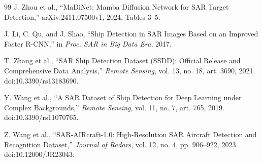 \documentclass[journal]{IEEEtran}
\begin{document}
\begin{thebibliography}{99}
J. Zhou et al., ``MaDiNet: Mamba Diffusion Network for SAR Target Detection,'' arXiv:2411.07500v1, 2024, Tables 3--5.

J. Li, C. Qu, and J. Shao, ``Ship Detection in SAR Images Based on an Improved Faster R-CNN,'' in \emph{Proc. SAR in Big Data Era}, 2017.

T. Zhang et al., ``SAR Ship Detection Dataset (SSDD): Official Release and Comprehensive Data Analysis,'' \emph{Remote Sensing}, vol. 13, no. 18, art. 3690, 2021. doi:10.3390/rs13183690.

Y. Wang et al., ``A SAR Dataset of Ship Detection for Deep Learning under Complex Backgrounds,'' \emph{Remote Sensing}, vol. 11, no. 7, art. 765, 2019. doi:10.3390/rs11070765.

Z. Wang et al., ``SAR-AIRcraft-1.0: High-Resolution SAR Aircraft Detection and Recognition Dataset,'' \emph{Journal of Radars}, vol. 12, no. 4, pp. 906--922, 2023. doi:10.12000/JR23043.
\end{thebibliography}
\end{document}
